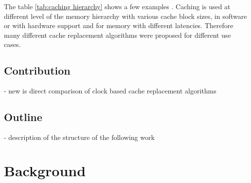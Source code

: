 \documentclass[
	12pt,
	a4paper,
	abstract,
	bibliography=totoc,
	chapterprefix,
	headings=openright,
	numbers=endperiod,
	parskip=half,
	twoside,
]{scrreprt}
\begin{document}




The table \ref{tab:caching hierarchy} shows a few examples \cite{7569243}.
Caching is used at different level of the memory hierarchy with various cache block sizes, in software or with hardware support and for memory with different latencies.
Therefore many different cache replacement algorithms were proposed for different use cases.



\section{Contribution}
- new is direct comparison of clock based cache replacement algorithms\\

\section{Outline}
- description of the structure of the following work\\


\chapter{Background}
\label{cha:background}

\end{document}
